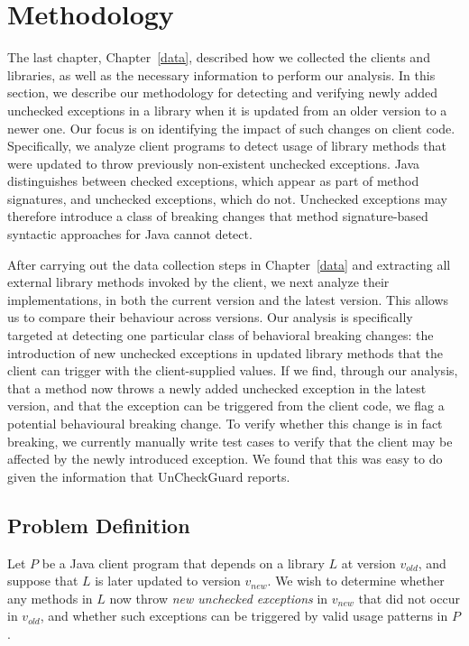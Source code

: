 \chapter{Methodology}\label{methodology}
The last chapter, Chapter~\ref{data}, described how we collected the clients and libraries, as well as the necessary information to perform our analysis. In this section, we describe our methodology for detecting and verifying newly added unchecked exceptions in a library when it is updated from an older version to a newer one. Our focus is on identifying the impact of such changes on client code. Specifically, we analyze client programs to detect usage of library methods that were updated to throw previously non-existent unchecked exceptions. Java distinguishes between checked exceptions, which appear as part of method signatures, and unchecked exceptions, which do not. Unchecked exceptions may therefore introduce a class of breaking changes that method signature-based syntactic approaches for Java cannot detect.

After carrying out the data collection steps in Chapter~\ref{data} and extracting all external library methods invoked by the client, we next analyze their implementations, in both the current version and the latest version. This allows us to compare their behaviour across versions. Our analysis is specifically targeted at detecting one particular class of behavioral breaking changes: the introduction of new unchecked exceptions in updated library methods that the client can trigger with the client-supplied values. If we find, through our analysis, that a method now throws a newly added unchecked exception in the latest version, and that the exception can be triggered from the client code, we flag a potential behavioural breaking change. To verify whether this change is in fact breaking, we currently manually write test cases to verify that the client may be affected by the newly introduced exception. We found that this was easy to do given the information that UnCheckGuard reports. 

\section{Problem Definition}

Let $P$ be a Java client program that depends on a library $L$ at version $v_{old}$, and suppose that $L$ is later updated to version $v_{new}$. We wish to determine whether any methods in $L$ now throw \textit{new unchecked exceptions} in $v_{new}$ that did not occur in $v_{old}$, and whether such exceptions can be triggered by valid usage patterns in $P$.

